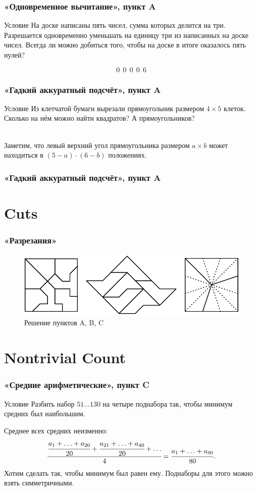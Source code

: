 \documentclass[aspectratio=1610,12pt]{beamer}
\def\fram#1#2{\begin{frame}\frametitle{\bf #1}#2\end{frame}}
\begin{document}
\fram{«Одновременное вычитание», пункт A}{
\begin{block}{Условие}
На доске написаны пять чисел, сумма которых делится на три. Разрешается одновременно уменьшать на единицу три из написанных на доске чисел. Всегда ли можно добиться того, чтобы на доске в итоге оказалось пять нулей?
\end{block} \pause
\vspace{-0.25cm}
{\large $$0\ \ 0\ \ 0\ \ 0\ \ 6$$}
}

\fram{«Гадкий аккуратный подсчёт», пункт A}{
\begin{block}{Условие}
Из клетчатой бумаги вырезали прямоугольник размером $4 \times 5$ клеток. Сколько на нём можно найти квадратов? А прямоугольников?
\end{block} \pause \ \\
\noindent Заметим, что левый верхний угол прямоугольника размером $a \times b$ может находиться в $(5-a) \cdot (6-b)$ положениях.
}

\fram{«Гадкий аккуратный подсчёт», пункт A}{\footnotesize

}

\section[Разрезания]{Cuts}
\fram{«Разрезания»}{
\begin{figure}
	\includegraphics[width=13cm]{images/fig-cuts}
	\caption{Решение пунктов A, B, C}
\end{figure}
}

\section[Нетривиальный счёт]{Nontrivial Count}
\fram{«Средние арифметические», пункт C}{
\begin{block}{Условие}
	Разбить набор $51 \ldots 130$ на четыре поднабора так, чтобы минимум средних был наибольшим.
\end{block}
\pause\medskip\noindent Среднее всех средних неизменно:
\vspace{-0.1cm}
	$$\cfrac{\cfrac{a_1 + \ldots + a_{20}}{20}
		+ \cfrac{a_{21} + \ldots + a_{40}}{20} + \ldots}{4} =
			\cfrac{a_1 + \ldots + a_{80}}{80}.$$
\vspace{-0.1cm}\noindent\pause
Хотим сделать так, чтобы минимум был равен ему. Поднаборы для этого можно взять симметричными.}
\end{document}
